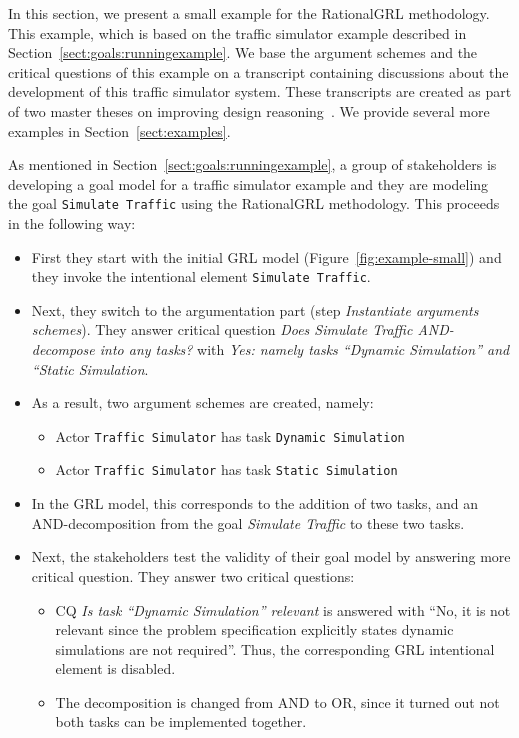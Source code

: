 In this section, we present a small example for the RationalGRL methodology. This example, which is based on the traffic simulator example described in Section~\ref{sect:goals:runningexample}. We base the argument schemes and the critical questions of this example on a transcript containing discussions about the development of this traffic simulator system. These transcripts are created as part of two master theses on improving design reasoning~\cite{masterthesis1,masterthesis2}. We provide several more examples in Section~\ref{sect:examples}.

As mentioned in Section~\ref{sect:goals:runningexample}, a group of stakeholders is developing a goal model for a traffic simulator example and they are modeling the goal \texttt{Simulate Traffic} using the RationalGRL methodology. This proceeds in the following way:
\begin{itemize}
\item
First they start %
with the initial GRL model (Figure~\ref{fig:example-small})  and they invoke the intentional element \texttt{Simulate Traffic}. %
\item Next, they switch to the argumentation part (step \emph{Instantiate arguments schemes}). They answer critical question \emph{Does Simulate Traffic AND-decompose into any tasks?} with \emph{Yes: namely tasks ``Dynamic Simulation'' and ``Static Simulation}.
\item As a result, two argument schemes are created, namely:
\begin{itemize}
\item Actor \texttt{Traffic Simulator} has task \texttt{Dynamic Simulation}
\item Actor \texttt{Traffic Simulator} has task \texttt{Static Simulation}
\end{itemize}
\item In the GRL model, this corresponds to the addition of two tasks, and an AND-decomposition from the goal \emph{Simulate Traffic} to these two tasks.
\item Next, the stakeholders test the validity of their goal model by answering more critical question. They answer two critical questions:
\begin{itemize}
\item
CQ \emph{Is task ``Dynamic Simulation'' relevant} is answered with ``No, it is not relevant since the problem specification explicitly states dynamic simulations are not required''. Thus, the corresponding GRL intentional element is disabled.
\item The decomposition is changed from AND to OR, since it turned out not both tasks can be implemented together.
\end{itemize}
\end{itemize}

